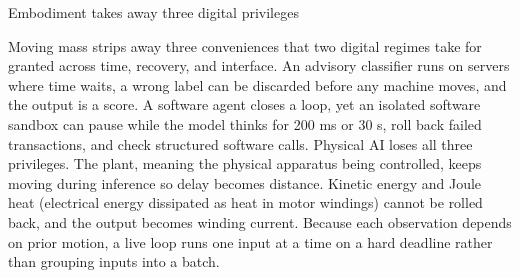 \documentclass[aspectratio=169, 12pt]{beamer}
\begin{document}
\begin{frame}{Embodiment takes away three digital privileges}
{  Moving mass strips away three conveniences that two digital regimes take for granted across time, recovery, and interface. An advisory classifier runs on servers where time waits, a wrong label can be discarded before any machine moves, and the output is a score. A software agent closes a loop, yet an isolated software sandbox can pause while the model thinks for 200 ms or 30 s, roll back failed transactions, and check structured software calls. Physical AI loses all three privileges. The plant, meaning the physical apparatus being controlled, keeps moving during inference so delay becomes distance. Kinetic energy and Joule heat (electrical energy dissipated as heat in motor windings) cannot be rolled back, and the output becomes winding current. Because each observation depends on prior motion, a live loop runs one input at a time on a hard deadline rather than grouping inputs into a batch.


}
\end{frame}
\end{document}
